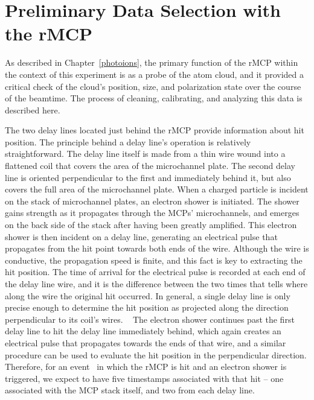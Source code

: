 \section{Preliminary Data Selection with the rMCP}
\label{sec:rmcp_cuts}
As described in Chapter~\ref{photoions}, the primary function of the rMCP within the context of this experiment is as a probe of the atom cloud, and it provided a critical check of the cloud's position, size, and polarization state over the course of the beamtime.  The process of cleaning, calibrating, and analyzing this data is described here.  

The two delay lines located just behind the rMCP provide information about hit position.  The principle behind a delay line's operation is relatively straightforward.  The delay line itself is made from a thin wire wound into a flattened coil that covers the area of the microchannel plate.  The second delay line is oriented perpendicular to the first and immediately behind it, but also covers the full area of the microchannel plate.  When a charged particle is incident on the stack of microchannel plates, an electron shower is initiated.  The shower gains strength as it propagates through the MCPs' microchannels, and emerges on the back side of the stack after having been greatly amplified.  This electron shower is then incident on a delay line, generating an electrical pulse that propagates from the hit point towards both ends of the wire.  Although the wire is conductive, the propagation speed is finite, and this fact is key to extracting the hit position.  The time of arrival for the electrical pulse is recorded at each end of the delay line wire, and it is the difference between the two times that tells where along the wire the original hit occurred.  In general, a single delay line is only precise enough to determine the hit position as projected along the direction perpendicular to its coil's wires.
~ 
The electron shower continues past the first delay line to hit the delay line immediately behind, which again creates an electrical pulse that propagates towards the ends of that wire, and a similar procedure can be used to evaluate the hit position in the perpendicular direction.  Therefore, for an event~ in which the rMCP is hit and an electron shower is triggered, we expect to have five timestamps associated with that hit -- one associated with the MCP stack itself, and two from each delay line.

